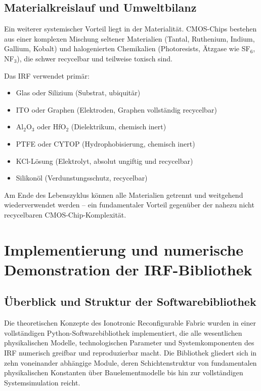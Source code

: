 ﻿\documentclass[a4paper,12pt]{scrreprt}
\theoremstyle{definition}
\begin{document}
\subsection{Materialkreislauf und Umweltbilanz}

Ein weiterer systemischer Vorteil liegt in der Materialität.
CMOS-Chips bestehen aus einer komplexen Mischung seltener Materialien
(Tantal, Ruthenium, Indium, Gallium, Kobalt) und halogenierten Chemikalien
(Photoresists, Ätzgase wie SF$_6$, NF$_3$), die schwer recycelbar und
teilweise toxisch sind.

Das IRF verwendet primär:
\begin{itemize}
	\item Glas oder Silizium (Substrat, ubiquitär)
	\item ITO oder Graphen (Elektroden, Graphen vollständig recycelbar)
	\item Al$_2$O$_3$ oder HfO$_2$ (Dielektrikum, chemisch inert)
	\item PTFE oder CYTOP (Hydrophobisierung, chemisch inert)
	\item KCl-Lösung (Elektrolyt, absolut ungiftig und recycelbar)
	\item Silikonöl (Verdunstungsschutz, recycelbar)
\end{itemize}
Am Ende des Lebenszyklus können alle Materialien getrennt und weitgehend
wiederverwendet werden -- ein fundamentaler Vorteil gegenüber der
nahezu nicht recycelbaren CMOS-Chip-Komplexität.

\section{Implementierung und numerische Demonstration der IRF-Bibliothek}
\label{sec:demo}

\subsection{Überblick und Struktur der Softwarebibliothek}

Die theoretischen Konzepte des Ionotronic Reconfigurable Fabric wurden in einer
vollständigen Python-Softwarebibliothek implementiert, die alle wesentlichen
physikalischen Modelle, technologischen Parameter und Systemkomponenten des IRF
numerisch greifbar und reproduzierbar macht. Die Bibliothek gliedert sich in zehn
voneinander abhängige Module, deren Schichtenstruktur von fundamentalen
physikalischen Konstanten über Bauelementmodelle bis hin zur vollständigen
Systemsimulation reicht.
\end{document}
